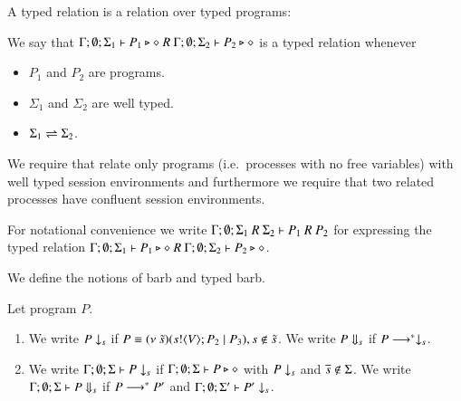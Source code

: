 
A typed relation is a relation over typed programs:

\begin{definition}\rm
	We say that
	$\Gamma; \emptyset; \Sigma_1 \vdash P_1 \triangleright \diamond\ R\ \Gamma; \emptyset; \Sigma_2 \vdash P_2 \triangleright \diamond$
	is a typed relation whenever
	\begin{itemize}
		\item	$P_1$ and $P_2$ are programs.
		\item	$\Sigma_1$ and $\Sigma_2$ are well typed.
		\item	$\Sigma_1 \rightleftharpoons \Sigma_2$.
	\end{itemize}
\end{definition}

We require that relate only programs (i.e.\ processes with no free variables) with
well typed session environments and furthermore we require that two related processes
have confluent session environments.

For notational convenience we write $\Gamma; \emptyset; \Sigma_1\ R\ \Sigma_2 \vdash P_1\ R\ P_2$
for expressing the typed relation $\Gamma; \emptyset; \Sigma_1 \vdash P_1 \triangleright \diamond\ R\ \Gamma; \emptyset; \Sigma_2 \vdash P_2 \triangleright \diamond$.

We define the notions of barb and typed barb.

\begin{definition}[Barbs]\rm
	Let program $P$.
	\begin{enumerate}

		\item	We write $P \downarrow_{s}$ if $P \equiv (\nu\ \tilde{s})(s ! \langle V \rangle ; P_2 \;|\; P_3), s \notin \tilde{s}$.
			We write $P \Downarrow_{s}$ if $P \longrightarrow^* \downarrow_{s}$.

		\item	We write $\Gamma; \emptyset; \Sigma \vdash P \downarrow_{s}$ if
			$\Gamma; \emptyset; \Sigma \vdash P \triangleright \diamond$ with $P \downarrow_{s}$ and $\overline{s} \notin \Sigma$.
			We write $\Gamma; \emptyset; \Sigma \vdash P \Downarrow_{s}$ if $P \longrightarrow^* P'$ and
			$\Gamma; \emptyset; \Sigma' \vdash P' \downarrow_{s}$.			
	\end{enumerate}
\end{definition}

